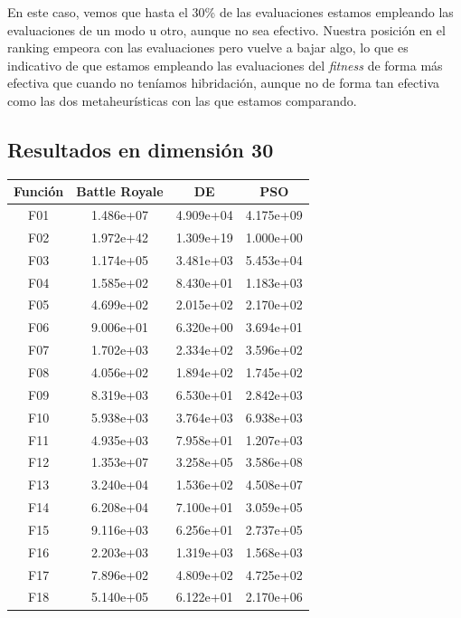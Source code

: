 \documentclass[11pt]{article}
\begin{document}
En este caso, vemos que hasta el 30\% de las evaluaciones estamos empleando las evaluaciones de un modo u otro, aunque no sea efectivo. Nuestra posición en el ranking empeora con las evaluaciones pero vuelve a bajar algo, lo que es indicativo de que estamos empleando las evaluaciones del \emph{fitness} de forma más efectiva que cuando no teníamos hibridación, aunque no de forma tan efectiva como las dos metaheurísticas con las que estamos comparando.

\subsection{Resultados en dimensión 30} \label{resultados_30_memetic}

\begin{table}[H]
\centering
\begin{tabular}{|c|c|c|c|}
\hline
\textbf{Función} & \textbf{Battle Royale} &         \textbf{DE} &        \textbf{PSO} \\
\hline
F01  &     1.486e+07 &  4.909e+04 &  4.175e+09 \\
F02  &     1.972e+42 &  1.309e+19 &  1.000e+00 \\
F03  &     1.174e+05 &  3.481e+03 &  5.453e+04 \\
F04  &     1.585e+02 &  8.430e+01 &  1.183e+03 \\
F05  &     4.699e+02 &  2.015e+02 &  2.170e+02 \\
F06  &     9.006e+01 &  6.320e+00 &  3.694e+01 \\
F07  &     1.702e+03 &  2.334e+02 &  3.596e+02 \\
F08  &     4.056e+02 &  1.894e+02 &  1.745e+02 \\
F09  &     8.319e+03 &  6.530e+01 &  2.842e+03 \\
F10  &     5.938e+03 &  3.764e+03 &  6.938e+03 \\
F11  &     4.935e+03 &  7.958e+01 &  1.207e+03 \\
F12  &     1.353e+07 &  3.258e+05 &  3.586e+08 \\
F13  &     3.240e+04 &  1.536e+02 &  4.508e+07 \\
F14  &     6.208e+04 &  7.100e+01 &  3.059e+05 \\
F15  &     9.116e+03 &  6.256e+01 &  2.737e+05 \\
F16  &     2.203e+03 &  1.319e+03 &  1.568e+03 \\
F17  &     7.896e+02 &  4.809e+02 &  4.725e+02 \\
F18  &     5.140e+05 &  6.122e+01 &  2.170e+06 \\

\end{tabular}
\end{table}
\end{document}
